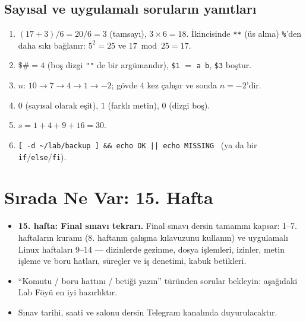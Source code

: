 \documentclass[11pt,a4paper]{article}
\begin{document}
\subsection*{Sayısal ve uygulamalı soruların yanıtları}
\begin{enumerate}[leftmargin=1.6em,start=9]
  \item $(17+3)/6 = 20/6 = 3$ (tamsayı), $3 \times 6 = 18$. İkincisinde \texttt{**} (üs alma) \texttt{\%}'den daha sıkı bağlanır: $5^2 = 25$ ve $17 \bmod 25 = 17$.
  \item $\$\# = 4$ (boş dizgi \texttt{""} de bir argümandır), \texttt{\$1} $=$ \texttt{a b}, \texttt{\$3} boştur.
  \item $n$: $10 \to 7 \to 4 \to 1 \to -2$; gövde $4$ kez çalışır ve sonda $n = -2$'dir.
  \item $0$ (sayısal olarak eşit), $1$ (farklı metin), $0$ (dizgi boş).
  \item $s = 1 + 4 + 9 + 16 = 30$.
  \item \texttt{[ -d \textasciitilde/lab/backup ] \&\& echo OK || echo MISSING} \ (ya da bir \texttt{if}/\texttt{else}/\texttt{fi}).
\end{enumerate}

\section{Sırada Ne Var: 15. Hafta}

\begin{itemize}
  \item \textbf{15. hafta: Final sınavı tekrarı.} Final sınavı dersin tamamını kapsar: 1--7. haftaların kuramı (8. haftanın çalışma kılavuzunu kullanın) ve uygulamalı Linux haftaları 9--14 --- dizinlerde gezinme, dosya işlemleri, izinler, metin işleme ve boru hatları, süreçler ve iş denetimi, kabuk betikleri.
  \item “Komutu / boru hattını / betiği yazın” türünden sorular bekleyin: aşağıdaki Lab Föyü en iyi hazırlıktır.
  \item Sınav tarihi, saati ve salonu dersin Telegram kanalında duyurulacaktır.
\end{itemize}
\end{document}
